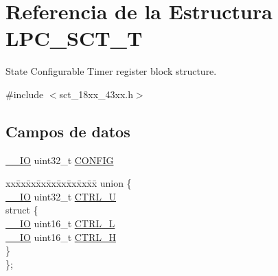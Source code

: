 \hypertarget{struct_l_p_c___s_c_t___t}{}\section{Referencia de la Estructura L\+P\+C\+\_\+\+S\+C\+T\+\_\+T}
\label{struct_l_p_c___s_c_t___t}


State Configurable Timer register block structure.  




{\ttfamily \#include $<$sct\+\_\+18xx\+\_\+43xx.\+h$>$}

\subsection*{Campos de datos}
\begin{DoxyCompactItemize}
\item 
\hyperlink{core__sc300_8h_aec43007d9998a0a0e01faede4133d6be}{\+\_\+\+\_\+\+IO} uint32\+\_\+t \hyperlink{struct_l_p_c___s_c_t___t_aed40378e2ce292435df51ff247d0cb78}{C\+O\+N\+F\+IG}
\item 
\begin{tabbing}
xx\=xx\=xx\=xx\=xx\=xx\=xx\=xx\=xx\=\kill
union \{\\
\>\hyperlink{core__sc300_8h_aec43007d9998a0a0e01faede4133d6be}{\_\_IO} uint32\_t \hyperlink{struct_l_p_c___s_c_t___t_a7a1ecdee35c5253f466a7f1d777809bb}{CTRL\_U}\\
\>struct \{\\
\>\>\hyperlink{core__sc300_8h_aec43007d9998a0a0e01faede4133d6be}{\_\_IO} uint16\_t \hyperlink{struct_l_p_c___s_c_t___t_a42dae746c8f5aaaa5f392ec6c6c20ce8}{CTRL\_L}\\
\>\>\hyperlink{core__sc300_8h_aec43007d9998a0a0e01faede4133d6be}{\_\_IO} uint16\_t \hyperlink{struct_l_p_c___s_c_t___t_a3daf21dc3405c95c831aa6e76854dfee}{CTRL\_H}\\
\>\} \\
\}; \\


\end{tabbing}
\end{DoxyCompactItemize}
